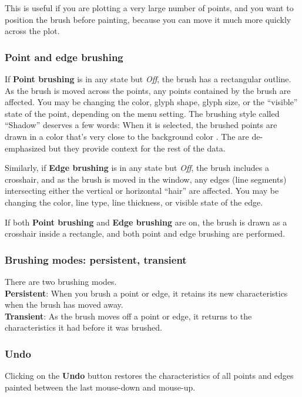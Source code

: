 \documentclass[11pt]{article}
\begin{document}
This is useful if you are plotting a very large number of points,
and you want to position the brush before painting, because you
can move it much more quickly across the plot.  

\subsubsection{Point and edge brushing}
%
If {\bf Point brushing} is in any state but {\it Off}, the brush has a
rectangular outline.  As the brush is moved across the points, any
points contained by the brush are affected.  You may be changing the
color, glyph shape, glyph size, or the ``visible'' state of the point,
depending on the menu setting.  The brushing style called ``Shadow'' 
deserves a few words: When it is selected, the brushed points are drawn
in a color that's very close to the background color \cite{BeckerCleveland87}. 
The
are de-emphasized but they provide context for the rest of the data.

Similarly, if {\bf Edge brushing} is in any state but {\it Off}, the
brush includes a crosshair, and as the brush is moved in the window,
any edges (line segments) intersecting either the vertical or
horizontal ``hair'' are affected.  You may be changing the color,
line type, line thickness, or visible state of the edge.

If both {\bf Point brushing} and {\bf Edge brushing} are on, the
brush is drawn as a crosshair inside a rectangle, and both point and
edge brushing are performed.

\subsubsection{Brushing modes:  persistent, transient}
%
There are two brushing modes.
\medskip
\noindent
\\{\bf Persistent}:  When you brush a point or edge, it retains its new
  characteristics when the brush has moved away.
\\{\bf Transient}:  As the brush moves off a point or edge, it returns
  to the characteristics it had before it was brushed.

\subsubsection{Undo}
%
Clicking on the {\bf Undo} button restores the characteristics
of all points and edges painted between the last mouse-down and
mouse-up.
\end{document}
